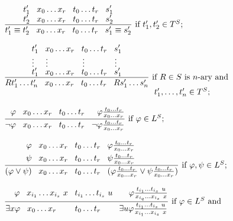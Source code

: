 \begin{enumerate}[1.]
\[\begin{array}{l}
\, \\
\, \\
\, \\
\displaystyle \frac{ {\displaystyle t_1^\prime \;\;\; x_0 \ldots x_r \;\;\; t_0 \ldots t_r \;\;\; s_1^\prime \atop 
\displaystyle t_2^\prime \;\;\; x_0 \ldots x_r \;\;\; t_0 \ldots t_r \;\;\; s_2^\prime} }{t_1^\prime \equiv t_2^\prime \;\;\; x_0 \ldots x_r \;\;\; t_0 \ldots t_r \;\;\; s_1^\prime \equiv s_2^\prime} \mbox{ if $t_1^\prime , t_2^\prime \in T^S$}; \\
\, \\
\displaystyle \frac{{{\displaystyle  t_1^\prime \;\;\; x_0 \ldots x_r \;\;\; t_0 \ldots t_r \;\;\; s_1^\prime 
\atop 
\displaystyle  \;\; \vdots  \;\;\;\;\;  \vdots  \;\;\;\;\;\;\;\;\;\;\;\;\;\;\;  \vdots  \;\;\;\;\;\;\;\;\;\;\;\;\; \vdots \;\;\;\; } 
\atop 
\displaystyle  t_1^\prime \;\;\; x_0 \ldots x_r \;\;\; t_0 \ldots t_r \;\;\; s_1^\prime}}{Rt_1^\prime \ldots t_n^\prime \;\;\; x_0 \ldots x_r \;\;\; t_0 \ldots t_r \;\;\; Rs_1^\prime \ldots s_n^\prime} \mbox{ if $R \in S$ is $n$-ary and } \\
\phantom{Rt_1^\prime \ldots t_n^\prime \;\;\; x_0 \ldots x_r \;\;\; t_0 \ldots t_r \;\;\; Rs_1^\prime \ldots s_n^\prime} \;\;\; t_1^\prime, \ldots, t_n^\prime \in T^S; \\
\, \\
\displaystyle \frac{ \phantom{\neg} \varphi \;\;\; x_0 \ldots x_r \;\;\; t_0 \ldots t_r \;\;\; \phantom{\neg} \varphi \frac{t_0 \ldots t_r}{x_0 \ldots x_r} }{\neg \varphi \;\;\; x_0 \ldots x_r \;\;\; t_0 \ldots t_r \;\;\; \neg \varphi \frac{t_0 \ldots t_r}{x_0 \ldots x_r} } \mbox{ if $\varphi \in L^S$}; \\
\, \\
\displaystyle \frac{ \displaystyle { 
\phantom{( \lor \psi)} \varphi \;\;\; x_0 \ldots x_r \;\;\; t_0 \ldots t_r \;\;\; \varphi \frac{t_0 \ldots t_r}{x_0 \ldots x_r} \phantom{( \lor \psi \frac{t_0 \ldots t_r}{x_0 \ldots x_r} )}
\atop
\phantom{( \lor \varphi)} \psi \;\;\; x_0 \ldots x_r \;\;\; t_0 \ldots t_r \;\;\;  \psi \frac{t_0 \ldots t_r}{x_0 \ldots x_r} \phantom{( \lor \varphi \frac{t_0 \ldots t_r}{x_0 \ldots x_r} )}
 } }
{(\varphi \lor \psi) \;\;\; x_0 \ldots x_r \;\;\; t_0 \ldots t_r \;\;\; (\varphi \frac{t_0 \ldots t_r}{x_0 \ldots x_r} \lor \psi \frac{t_0 \ldots t_r}{x_0 \ldots x_r} )} 
\mbox{ if $\varphi, \psi \in L^S$}; \\
\, \\
\displaystyle 
\frac{\phantom{\exists x} \varphi \;\;\; x_{i_1} \ldots x_{i_s} \  x \;\;\; t_{i_1} \ldots t_{i_s} \  u \;\;\; \phantom{\exists u} \varphi \frac{t_{i_1} \ldots t_{i_s} \  u }{ x_{i_q} \ldots x_{i_s} \  x }}{\exists x \varphi \;\;\; x_0 \ldots x_r \phantom{\;\;\; x} \;\;\; t_0 \ldots t_r \phantom{\;\;\; u} \;\;\; \exists u \varphi \frac{t_{i_1} \ldots t_{i_s} \  u }{ x_{i_1} \ldots x_{i_s} \  x }} \mbox{ if $\varphi \in L^S$ and}

\end{array}\]
\end{enumerate}
